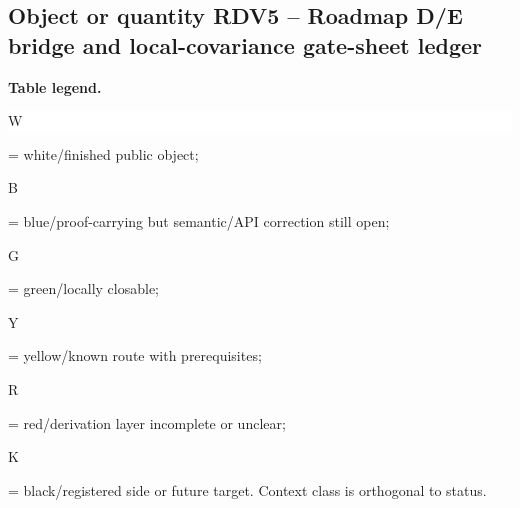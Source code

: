 \subsection*{Object or quantity RDV5 -- Roadmap D/\allowbreak{}E bridge and local-covariance gate-sheet ledger}
\hypertarget{objproof:RDV5}{}
\par\smallskip\noindent\begin{minipage}{0.99\linewidth}\footnotesize\raggedright\textbf{Table legend.} \colorbox{white}{\strut W} = white/finished public object; \colorbox{cyan!20}{\strut B} = blue/proof-carrying but semantic/API correction still open; \colorbox{green!18}{\strut G} = green/locally closable; \colorbox{yellow!25}{\strut Y} = yellow/known route with prerequisites; \colorbox{red!20}{\strut R} = red/derivation layer incomplete or unclear; \colorbox{black!18}{\strut K} = black/registered side or future target. Context class is orthogonal to status.\end{minipage}\par\vspace{0.25em}
